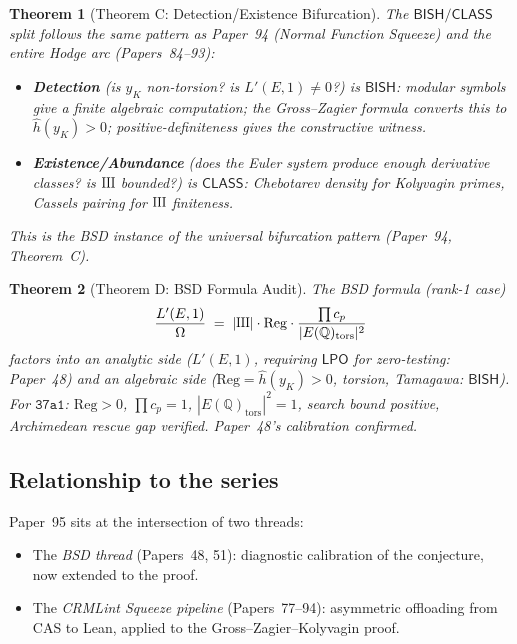 \documentclass[11pt]{article}
\theoremstyle{plain}
\newtheorem{theorem}{Theorem}[section]
\theoremstyle{definition}
\theoremstyle{remark}
\newcommand{\Q}{\mathbb{Q}}
\newcommand{\Sha}{\text{\raisebox{0.05ex}{\scalebox{0.85}[1]{III}}}}
\newcommand{\Reg}{\mathrm{Reg}}
\newcommand{\BISH}{\ensuremath{\mathsf{BISH}}}
\newcommand{\LPO}{\ensuremath{\mathsf{LPO}}}
\newcommand{\CLASS}{\ensuremath{\mathsf{CLASS}}}
\newcommand{\hhat}{\hat{h}}
\begin{document}
\begin{theorem}[Theorem C: Detection/Existence Bifurcation]
\label{thm:C}
The $\BISH/\CLASS$ split follows the same pattern as Paper~94 \emph{(Normal Function Squeeze)} and the entire Hodge arc \emph{(Papers~84--93)}:
\begin{itemize}[nosep]
\item \textbf{Detection} (is $y_K$ non-torsion? is $L'(E,1) \neq 0$?) is $\BISH$: modular symbols give a finite algebraic computation; the Gross--Zagier formula converts this to $\hhat(y_K) > 0$; positive-definiteness gives the constructive witness.
\item \textbf{Existence/Abundance} (does the Euler system produce enough derivative classes? is $\Sha$ bounded?) is $\CLASS$: Chebotarev density for Kolyvagin primes, Cassels pairing for $\Sha$ finiteness.
\end{itemize}
This is the BSD instance of the universal bifurcation pattern (Paper~94, Theorem~C).
\end{theorem}

\begin{theorem}[Theorem D: BSD Formula Audit]
\label{thm:D}
The BSD formula (rank-1 case)
\begin{equation}\label{eq:bsd}
\frac{L'(E,1)}{\Omega} \;=\; |\Sha| \cdot \Reg \cdot \frac{\prod c_p}{|E(\Q)_{\mathrm{tors}}|^2}
\end{equation}
factors into an analytic side ($L'(E,1)$, requiring $\LPO$ for zero-testing: Paper~48) and an algebraic side ($\Reg = \hhat(y_K) > 0$, torsion, Tamagawa: $\BISH$). For $\texttt{37a1}$: $\Reg > 0$, $\prod c_p = 1$, $|E(\Q)_{\mathrm{tors}}|^2 = 1$, search bound positive, Archimedean rescue gap verified. Paper~48's calibration confirmed.
\end{theorem}

\subsection{Relationship to the series}

Paper~95 sits at the intersection of two threads:
\begin{itemize}[nosep]
\item The \emph{BSD thread} (Papers~48, 51): diagnostic calibration of the conjecture, now extended to the proof.
\item The \emph{CRMLint Squeeze pipeline} (Papers~77--94): asymmetric offloading from CAS to Lean, applied to the Gross--Zagier--Kolyvagin proof.
\end{itemize}
\end{document}
